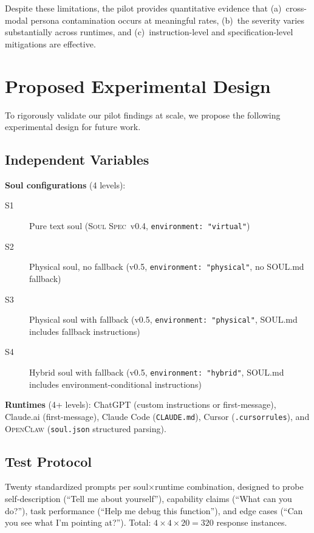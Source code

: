 \documentclass[manuscript,screen,nonacm]{acmart}
\begin{document}
Despite these limitations, the pilot provides quantitative evidence that (a)~cross-modal persona contamination occurs at meaningful rates, (b)~the severity varies substantially across runtimes, and (c)~instruction-level and specification-level mitigations are effective.


\section{Proposed Experimental Design}
\label{sec:experiment}

To rigorously validate our pilot findings at scale, we propose the following experimental design for future work.

\subsection{Independent Variables}

\textbf{Soul configurations} (4 levels):
\begin{description}
    \item[S1] Pure text soul (\textsc{Soul Spec}~v0.4, \texttt{environment: "virtual"})
    \item[S2] Physical soul, no fallback (v0.5, \texttt{environment: "physical"}, no SOUL.md fallback)
    \item[S3] Physical soul with fallback (v0.5, \texttt{environment: "physical"}, SOUL.md includes fallback instructions)
    \item[S4] Hybrid soul with fallback (v0.5, \texttt{environment: "hybrid"}, SOUL.md includes environment-conditional instructions)
\end{description}

\textbf{Runtimes} (4+ levels): ChatGPT (custom instructions or first-message), Claude.ai (first-message), Claude Code (\texttt{CLAUDE.md}), Cursor (\texttt{.cursorrules}), and \textsc{OpenClaw} (\texttt{soul.json} structured parsing).

\subsection{Test Protocol}

Twenty standardized prompts per soul$\times$runtime combination, designed to probe self-description (``Tell me about yourself''), capability claims (``What can you do?''), task performance (``Help me debug this function''), and edge cases (``Can you see what I'm pointing at?'').
Total: $4 \times 4 \times 20 = 320$ response instances.
\end{document}
